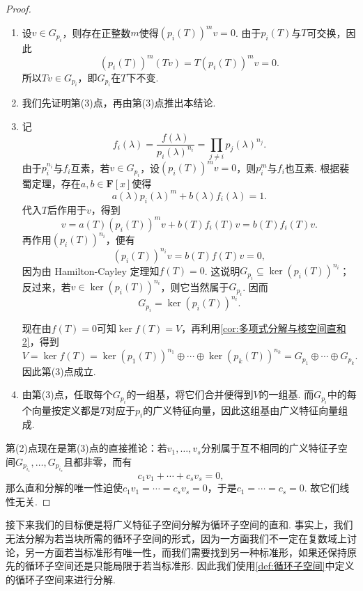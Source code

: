 \begin{proof}
    \begin{enumerate}
        \item 设$v\in G_{p_i}$，则存在正整数$m$使得$(p_i(T))^mv=0$. 由于$p_i(T)$与$T$可交换，因此
              \[
                  (p_i(T))^m(Tv)=T(p_i(T))^mv=0.
              \]
              所以$Tv\in G_{p_i}$，即$G_{p_i}$在$T$下不变.

        \item 我们先证明第(3)点，再由第(3)点推出本结论.

        \item 记
              \[
                  f_i(\lambda)=\frac{f(\lambda)}{p_i(\lambda)^{n_i}}=\prod_{j\neq i}p_j(\lambda)^{n_j}.
              \]
              由于$p_i^{n_i}$与$f_i$互素，若$v\in G_{p_i}$，设$(p_i(T))^mv=0$，则$p_i^m$与$f_i$也互素. 根据裴蜀定理，存在$a,b\in\mathbf{F}[x]$使得
              \[
                  a(\lambda)p_i(\lambda)^m+b(\lambda)f_i(\lambda)=1.
              \]
              代入$T$后作用于$v$，得到
              \[
                  v=a(T)(p_i(T))^mv+b(T)f_i(T)v=b(T)f_i(T)v.
              \]
              再作用$(p_i(T))^{n_i}$，便有
              \[
                  (p_i(T))^{n_i}v=b(T)f(T)v=0,
              \]
              因为由 Hamilton-Cayley 定理知$f(T)=0$. 这说明$G_{p_i}\subseteq \ker (p_i(T))^{n_i}$；反过来，若$v\in \ker (p_i(T))^{n_i}$，则它当然属于$G_{p_i}$. 因而
              \[
                  G_{p_i}=\ker (p_i(T))^{n_i}.
              \]

              现在由$f(T)=0$可知$\ker f(T)=V$，再利用\autoref{cor:多项式分解与核空间直和2}，得到
              \[
                  V=\ker f(T)=\ker (p_1(T))^{n_1}\oplus\cdots\oplus\ker (p_k(T))^{n_k}=G_{p_1}\oplus\cdots\oplus G_{p_k}.
              \]
              因此第(3)点成立.

        \item 由第(3)点，任取每个$G_{p_i}$的一组基，将它们合并便得到$V$的一组基. 而$G_{p_i}$中的每个向量按定义都是$T$对应于$p_i$的广义特征向量，因此这组基由广义特征向量组成.
    \end{enumerate}

    第(2)点现在是第(3)点的直接推论：若$v_1,\ldots,v_s$分别属于互不相同的广义特征子空间$G_{p_{i_1}},\ldots,G_{p_{i_s}}$且都非零，而有
    \[
        c_1v_1+\cdots+c_sv_s=0,
    \]
    那么直和分解的唯一性迫使$c_1v_1=\cdots=c_sv_s=0$，于是$c_1=\cdots=c_s=0$. 故它们线性无关.
\end{proof}

接下来我们的目标便是将广义特征子空间分解为循环子空间的直和. 事实上，我们无法分解为若当块所需的循环子空间的形式，因为一方面我们不一定在复数域上讨论，另一方面若当标准形有唯一性，而我们需要找到另一种标准形，如果还保持原先的循环子空间还是只能局限于若当标准形. 因此我们使用\autoref{def:循环子空间}中定义的循环子空间来进行分解.

